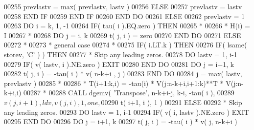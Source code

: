 \begin{DoxyCode}
00255                   prevlastv = max( prevlastv, lastv )
00256                \textcolor{keywordflow}{ELSE}
00257                   prevlastv = lastv
00258 \textcolor{keywordflow}{               END IF}
00259 \textcolor{keywordflow}{            END IF}
00260 \textcolor{keywordflow}{         END DO}
00261       \textcolor{keywordflow}{ELSE}
00262          prevlastv = 1
00263          \textcolor{keywordflow}{DO} i = k, 1, -1
00264             \textcolor{keywordflow}{IF}( tau( i ).EQ.zero ) \textcolor{keywordflow}{THEN}
00265 \textcolor{comment}{*}
00266 \textcolor{comment}{*              H(i)  =  I}
00267 \textcolor{comment}{*}
00268                \textcolor{keywordflow}{DO} j = i, k
00269                   t( j, i ) = zero
00270 \textcolor{keywordflow}{               END DO}
00271             \textcolor{keywordflow}{ELSE}
00272 \textcolor{comment}{*}
00273 \textcolor{comment}{*              general case}
00274 \textcolor{comment}{*}
00275                \textcolor{keywordflow}{IF}( i.LT.k ) \textcolor{keywordflow}{THEN}
00276                   \textcolor{keywordflow}{IF}( lsame( storev, \textcolor{stringliteral}{'C'} ) ) \textcolor{keywordflow}{THEN}
00277 \textcolor{comment}{*                    Skip any leading zeros.}
00278                      \textcolor{keywordflow}{DO} lastv = 1, i-1
00279                         \textcolor{keywordflow}{IF}( v( lastv, i ).NE.zero ) \textcolor{keywordflow}{EXIT}
00280 \textcolor{keywordflow}{                     END DO}
00281                      \textcolor{keywordflow}{DO} j = i+1, k
00282                         t( j, i ) = -tau( i ) * v( n-k+i , j )
00283 \textcolor{keywordflow}{                     END DO}   
00284                      j = max( lastv, prevlastv )
00285 \textcolor{comment}{*}
00286 \textcolor{comment}{*                    T(i+1:k,i) = -tau(i) * V(j:n-k+i,i+1:k)**T * V(j:n-k+i,i)}
00287 \textcolor{comment}{*}
00288                      \textcolor{keyword}{CALL }dgemv( \textcolor{stringliteral}{'Transpose'}, n-k+i-j, k-i, -tau( i ),
00289      $                           v( j, i+1 ), ldv, v( j, i ), 1, one,
00290      $                           t( i+1, i ), 1 )
00291                   \textcolor{keywordflow}{ELSE}
00292 \textcolor{comment}{*                    Skip any leading zeros.}
00293                      \textcolor{keywordflow}{DO} lastv = 1, i-1
00294                         \textcolor{keywordflow}{IF}( v( i, lastv ).NE.zero ) \textcolor{keywordflow}{EXIT}
00295 \textcolor{keywordflow}{                     END DO}
00296                      \textcolor{keywordflow}{DO} j = i+1, k
00297                         t( j, i ) = -tau( i ) * v( j, n-k+i )

\end{DoxyCode}
